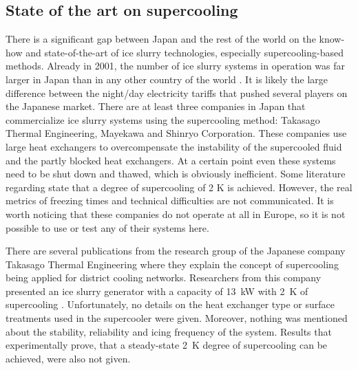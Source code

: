



\subsection{State of the art on supercooling}
\label{section_lit_review_supercooling}

There is a significant gap between Japan and the rest of the world on the know-how and state-of-the-art of ice slurry technologies, especially supercooling-based methods. Already in 2001, the number of ice slurry systems in operation was far larger in Japan than in any other country of the world \citep{kauffeld_ice_2019}. It is likely the large difference between the night/day electricity tariffs that pushed several players on the Japanese market. 
There are at least three companies in Japan that commercialize ice slurry systems using the supercooling method: Takasago Thermal Engineering, Mayekawa  and Shinryo Corporation. These companies use large heat exchangers to overcompensate the instability of the supercooled fluid and the partly blocked heat exchangers. At a certain point even these systems need to be shut down and thawed, which is obviously inefficient. Some literature regarding state that a degree of supercooling of 2 K is achieved.
However, the real metrics of freezing times and technical difficulties are not communicated. It is worth noticing that these companies do not operate at all in Europe, so it is not possible to use or test any of their systems here.
 
There are several publications from the research group of the Japanese company Takasago Thermal Engineering where they explain the concept of supercooling being applied for district cooling networks.
Researchers from this company presented an ice slurry generator with a capacity of 13~kW with 2~K of supercooling  \citep{tanino_ice-water_2001,kozawa_study_2005}. Unfortunately, no details on the heat exchanger type or surface treatments used in the supercooler were given. Moreover, nothing was mentioned about the stability, reliability and icing frequency of the system. Results that experimentally prove, that a steady-state 2~K degree of supercooling can be achieved, were also not given. 


